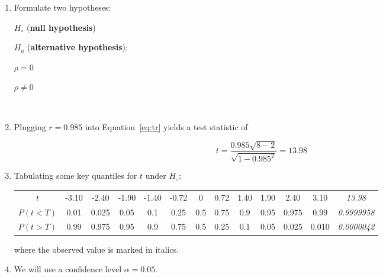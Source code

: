 \begin{enumerate}
\item Formulate two hypotheses:

  \noindent\begin{minipage}{.4\textwidth}
  $H_\circ$ (\textbf{null hypothesis})
  
  \vspace{1em}
  
  $H_a$ (\textbf{alternative hypothesis}):
\end{minipage}
\begin{minipage}{.2\textwidth}
\end{minipage}
\begin{minipage}{.2\textwidth}
  $\rho=0$
  
  \vspace{1em}
  
  $\rho\neq{0}$
\end{minipage}
\begin{minipage}{.2\textwidth}
\end{minipage}\\

\item Plugging $r = 0.985$ into Equation~\ref{eq:tr} yields a test
  statistic of

  \[
  t = \frac{0.985\sqrt{8-2}}{\sqrt{1-0.985^2}} = 13.98
  \]

\item Tabulating some key quantiles for $t$ under $H_\circ$:

  \begin{center}
    \begin{tabular}{c|c@{\gap}c@{\gap}c@{\gap}c@{\gap}
        c@{\gap}c@{\gap}c@{\gap}c@{\gap}c@{\gap}c@{\gap}c@{\gap}c}
      $t$ & -3.10 & -2.40 & -1.90 & -1.40 & -0.72 &
      0 & 0.72 & 1.40 & 1.90 & 2.40 & 3.10 & \emph{13.98}\\
      $P(t<T)$ & 0.01 & 0.025 & 0.05 & 0.1 & 0.25 &
      0.5 & 0.75 & 0.9 & 0.95 & 0.975 & 0.99 & \emph{0.9999958}\\
      $P(t>T)$ & 0.99 & 0.975 & 0.95 & 0.9 & 0.75 & 0.5 &
      0.25 & 0.1 & 0.05 & 0.025 & 0.010 & \emph{0.0000042}
    \end{tabular}
  \end{center}

  \noindent where the observed value is marked in italics.
  
\item We will use a confidence level $\alpha = 0.05$.


\end{enumerate}
